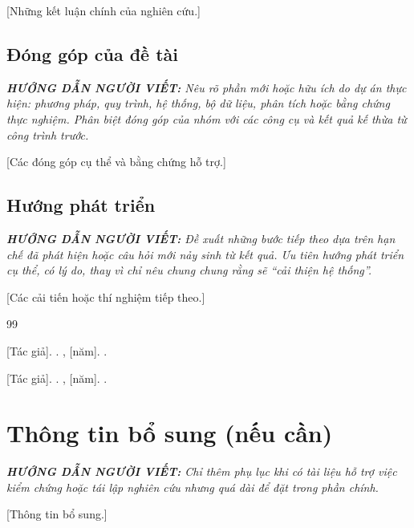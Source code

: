 \documentclass[12pt,a4paper]{report}
\newcommand{\huongdan}[1]{%
  \par\smallskip\noindent
  \textit{\textbf{HƯỚNG DẪN NGƯỜI VIẾT:} #1}%
  \par\smallskip}
\begin{document}
[Những kết luận chính của nghiên cứu.]

\section{Đóng góp của đề tài}

\huongdan{Nêu rõ phần mới hoặc hữu ích do dự án thực hiện: phương pháp, quy trình,
hệ thống, bộ dữ liệu, phân tích hoặc bằng chứng thực nghiệm. Phân biệt đóng góp
của nhóm với các công cụ và kết quả kế thừa từ công trình trước.}

[Các đóng góp cụ thể và bằng chứng hỗ trợ.]

\section{Hướng phát triển}

\huongdan{Đề xuất những bước tiếp theo dựa trên hạn chế đã phát hiện hoặc câu hỏi
mới nảy sinh từ kết quả. Ưu tiên hướng phát triển cụ thể, có lý do, thay vì chỉ
nêu chung chung rằng sẽ ``cải thiện hệ thống''.}

[Các cải tiến hoặc thí nghiệm tiếp theo.]

\begin{thebibliography}{99}

[Tác giả].
.
, [năm].
.

[Tác giả].
.
, [năm].
.

\end{thebibliography}

\appendix
\chapter{Thông tin bổ sung (nếu cần)}

\huongdan{Chỉ thêm phụ lục khi có tài liệu hỗ trợ việc kiểm chứng hoặc tái lập
nghiên cứu nhưng quá dài để đặt trong phần chính.}

[Thông tin bổ sung.]
\end{document}
